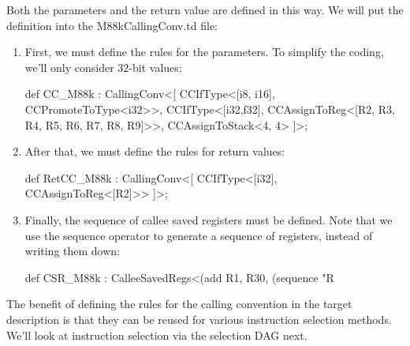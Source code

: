 Both the parameters and the return value are defined in this way. We will put the definition into the M88kCallingConv.td file:

\begin{enumerate}
\item
First, we must define the rules for the parameters. To simplify the coding, we’ll only consider 32-bit values:

\begin{cpp}
def CC_M88k : CallingConv<[
    CCIfType<[i8, i16], CCPromoteToType<i32>>,
    CCIfType<[i32,f32],
        CCAssignToReg<[R2, R3, R4, R5, R6, R7, R8, R9]>>,
    CCAssignToStack<4, 4>
]>;
\end{cpp}

\item
After that, we must define the rules for return values:

\begin{cpp}
def RetCC_M88k : CallingConv<[
    CCIfType<[i32], CCAssignToReg<[R2]>>
]>;
\end{cpp}

\item
Finally, the sequence of callee saved registers must be defined. Note that we use the sequence operator to generate a sequence of registers, instead of writing them down:

\begin{cpp}
def CSR_M88k :
    CalleeSavedRegs<(add R1, R30,
        (sequence "R%
\end{cpp}
\end{enumerate}

The benefit of defining the rules for the calling convention in the target description is that they can be reused for various instruction selection methods. We’ll look at instruction selection via the selection DAG next.




